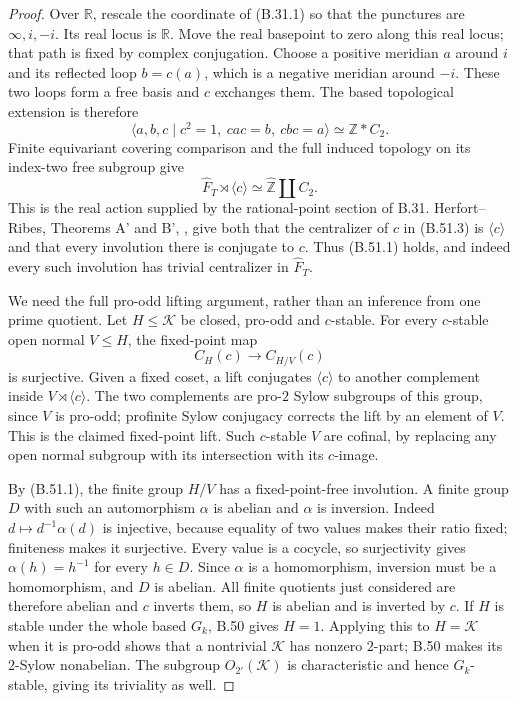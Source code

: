 \begin{proof}
Over $\mathbb R$, rescale the coordinate
of (B.31.1) so that the punctures are
$\infty,i,-i$.  Its real locus is
$\mathbb R$.  Move the real basepoint
to zero along this real locus; that
path is fixed by complex conjugation.
Choose a positive meridian $a$ around
$i$ and its reflected loop $b=c(a)$,
which is a negative meridian around
$-i$.  These two loops form a free
basis and $c$ exchanges them.
The based topological extension is
therefore
\[
 \langle a,b,c\mid c^2=1,\ cac=b,\ cbc=a\rangle
          \simeq\mathbb Z*C_2.                             \tag{B.51.2}
\]
Finite equivariant covering comparison
and the full induced topology on its
index-two free subgroup give
\[
          \widehat F_T\rtimes\langle c\rangle
                     \simeq\widehat{\mathbb Z}\amalg C_2.
                                                               \tag{B.51.3}
\]
This is the real action supplied by
the rational-point section of B.31.
Herfort--Ribes, Theorems A' and B',
\cite{A_HR1985}, give both that the
centralizer of $c$ in (B.51.3) is
$\langle c\rangle$ and that every
involution there is conjugate to
$c$.  Thus (B.51.1) holds, and
indeed every such involution has
trivial centralizer in $\widehat F_T$.

We need the full pro-odd lifting
argument, rather than an inference
from one prime quotient.  Let
$H\leq\mathcal K$ be closed,
pro-odd and $c$-stable.  For every
$c$-stable open normal $V\leq H$,
the fixed-point map
\[
                   C_H(c)\longrightarrow C_{H/V}(c)
\]
is surjective.  Given a fixed coset,
a lift conjugates $\langle c\rangle$
to another complement inside
$V\rtimes\langle c\rangle$.
The two complements are pro-$2$
Sylow subgroups of this group,
since $V$ is pro-odd; profinite
Sylow conjugacy corrects the lift
by an element of $V$.  This is
the claimed fixed-point lift.
Such $c$-stable $V$ are cofinal,
by replacing any open normal
subgroup with its intersection
with its $c$-image.

By (B.51.1), the finite group
$H/V$ has a fixed-point-free
involution.  A finite group
$D$ with such an automorphism
$\alpha$ is abelian and $\alpha$
is inversion.  Indeed
$d\mapsto d^{-1}\alpha(d)$ is
injective, because equality
of two values makes their
ratio fixed; finiteness makes
it surjective.  Every value
is a cocycle, so surjectivity
gives $\alpha(h)=h^{-1}$ for
every $h\in D$.  Since
$\alpha$ is a homomorphism,
inversion must be a homomorphism,
and $D$ is abelian.  All
finite quotients just considered
are therefore abelian and
$c$ inverts them, so $H$ is
abelian and is inverted by $c$.
If $H$ is stable under the
whole based $G_k$, B.50 gives
$H=1$.  Applying this to
$H=\mathcal K$ when it is
pro-odd shows that a nontrivial
$\mathcal K$ has nonzero
$2$-part; B.50 makes its
$2$-Sylow nonabelian.
The subgroup $O_{2'}(\mathcal K)$
is characteristic and hence
$G_k$-stable, giving its
triviality as well.


\end{proof}
